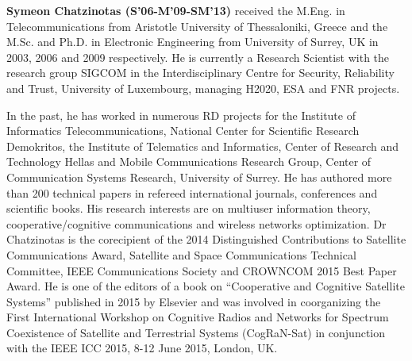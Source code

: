 \documentclass[journal, twocolumn]{IEEEtran}
\begin{document}
\begin{IEEEbiography}
{\textbf{Symeon Chatzinotas (S'06-M'09-SM'13)}} received the M.Eng. in Telecommunications from
Aristotle University of Thessaloniki, Greece and the
M.Sc. and Ph.D. in Electronic Engineering from
University of Surrey, UK in 2003, 2006 and 2009
respectively. He is currently a Research Scientist with
the research group SIGCOM in the Interdisciplinary
Centre for Security, Reliability and Trust, University
of Luxembourg, managing H2020, ESA and FNR
projects.

In the past, he has worked in numerous RD
projects for the Institute of Informatics Telecommunications,
National Center for Scientific Research Demokritos, the Institute of
Telematics and Informatics, Center of Research and Technology Hellas and
Mobile Communications Research Group, Center of Communication Systems
Research, University of Surrey. He has authored more than 200 technical
papers in refereed international journals, conferences and scientific books. His
research interests are on multiuser information theory, cooperative/cognitive
communications and wireless networks optimization. Dr Chatzinotas is the corecipient
of the 2014 Distinguished Contributions to Satellite Communications
Award, Satellite and Space Communications Technical Committee, IEEE
Communications Society and CROWNCOM 2015 Best Paper Award. He is one of the editors of a book on ``Cooperative
and Cognitive Satellite Systems'' published in 2015 by Elsevier and was involved in coorganizing
the First International Workshop on Cognitive Radios and Networks
for Spectrum Coexistence of Satellite and Terrestrial Systems (CogRaN-Sat)
in conjunction with the IEEE ICC 2015, 8-12 June 2015, London, UK.
\end{IEEEbiography}
\end{document}
